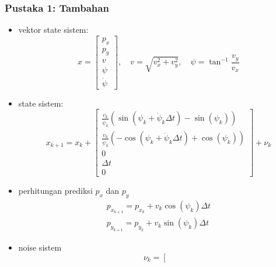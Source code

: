 \begin{frame}[allowframebreaks]
    \frametitle{Pustaka 1: Tambahan}

    \begin{itemize}
        \item vektor state sistem:
        \begin{equation}
            x=\left[\begin{array}{c}
            p_{x} \\
            p_{y} \\
            v \\
            \psi \\
            \dot{\psi}
            \end{array}\right], \quad v=\sqrt{v_{x}^{2}+v_{y}^{2}}, \quad \psi=\tan ^{-1} \frac{v_{y}}{v_{x}}
            \label{eq: 2-LREKF-state}
        \end{equation}
        \item state sistem:
        \begin{equation}
            x_{k+1}=x_{k}+\left[\begin{array}{c}
            \frac{v_{k}}{\dot{\psi}_{k}}\left(\sin \left(\psi_{k}+\dot{\psi}_{k} \Delta t\right)-\sin \left(\psi_{k}\right)\right) \\
            \frac{v_{k}}{\dot{\psi}_{k}}\left(-\cos \left(\psi_{k}+\dot{\psi}_{k} \Delta t\right)+\cos \left(\psi_{k}\right)\right) \\
            0 \\
            \Delta t \\
            0
            \end{array}\right]+\nu_{k}
            \label{eq: 2-LREKF-state-eq}
        \end{equation}
        \item perhitungan prediksi $p_x$ dan $p_y$
        \begin{equation}
            \begin{array}{l}
            p_{x_{k+1}}=p_{x_{k}}+v_{k} \cos \left(\psi_{k}\right) \Delta t \\
            p_{y_{k+1}}=p_{y_{k}}+v_{k} \sin \left(\psi_{k}\right) \Delta t
            \end{array}
            \label{eq: 2-LREKF-div0}
        \end{equation}
        \item noise sistem
        \begin{equation}
            \nu_{k}=\left[\begin{array}{c}

\end{array}
\end{equation}
\end{itemize}
\end{frame}
